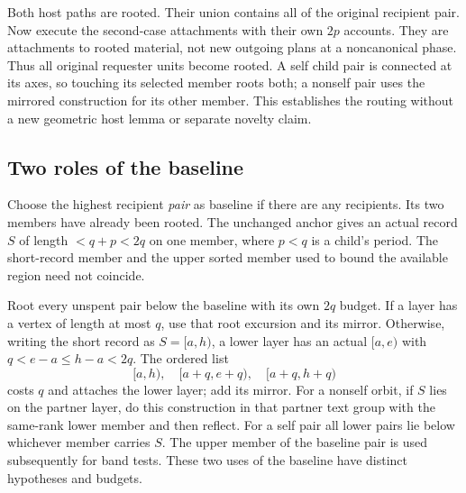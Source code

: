 Both host paths are rooted. Their union contains all of the original
recipient pair. Now execute the second-case attachments with their own
$2p$ accounts. They are attachments to rooted material, not new outgoing
plans at a noncanonical phase. Thus all original requester units become
rooted. A self child pair is connected at its axes, so touching its
selected member roots both; a nonself pair uses the mirrored construction
for its other member. This establishes the routing without a new
geometric host lemma or separate novelty claim.

\subsection{Two roles of the baseline}\label{sec:baseline}
Choose the highest recipient \emph{pair} as baseline if there are any
recipients. Its two members have already been rooted. The unchanged
anchor gives an actual record $S$ of length $<q+p<2q$ on one member,
where $p<q$ is a child's period. The short-record member and the upper
sorted member used to bound the available region need not coincide.

Root every unspent pair below the baseline with its own $2q$ budget.
If a layer has a vertex of length at most $q$, use that root excursion
and its mirror. Otherwise, writing the short record as $S=[a,h)$,
a lower layer has an actual $[a,e)$ with
$q<e-a\le h-a<2q$. The ordered list
\[
[a,h),\quad[a+q,e+q),\quad[a+q,h+q)
\]
costs $q$ and attaches the lower layer; add its mirror. For a nonself
orbit, if $S$ lies on the partner layer, do this construction in that
partner text group with the same-rank lower member and then reflect.
For a self pair all lower pairs lie below whichever member carries $S$.
The upper member of the baseline pair is used subsequently for band tests.
These two uses of the baseline have distinct hypotheses and budgets.
